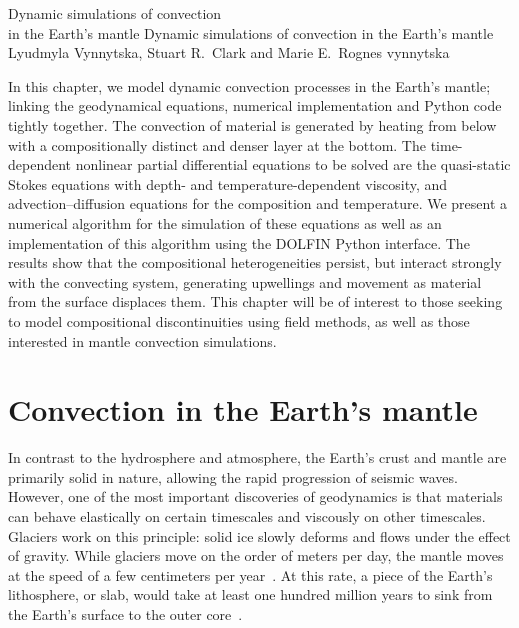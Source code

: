 \bgroup

\setcounter{chapter}{30}
\setcounter{chpnum}{30}

              {Dynamic simulations of convection\\ in the Earth's mantle}
              {Dynamic simulations of convection in the Earth's mantle}
              {Lyudmyla Vynnytska,  Stuart R.~Clark and Marie E.~Rognes}
              {vynnytska}


In this chapter, we model dynamic convection processes in the Earth's
mantle; linking the geodynamical equations, numerical implementation and
Python code tightly together. The convection of material is generated by
heating from below with a compositionally distinct and denser layer at
the bottom.  The time-dependent nonlinear partial differential equations
to be solved are the quasi-static Stokes equations with depth- and
temperature-dependent viscosity, and advection--diffusion equations for
the composition and temperature.  We present a numerical algorithm for
the simulation of these equations as well as an implementation of this
algorithm using the DOLFIN Python interface.  The results show that the
compositional heterogeneities persist, but interact strongly with the
convecting system, generating upwellings and movement as material from
the surface displaces them. This chapter will be of interest to those
seeking to model compositional discontinuities using field methods,
as well as those interested in mantle convection simulations.

\section{Convection in the Earth's mantle}

In contrast to the hydrosphere and atmosphere, the Earth's crust and
mantle are primarily solid in nature, allowing the rapid progression
of seismic waves.  However, one of the most important discoveries
of geodynamics is that materials can behave elastically on certain
timescales and viscously on other timescales. Glaciers work on this
principle: solid ice slowly deforms and flows under the effect of gravity.
While glaciers move on the order of meters per day, the mantle moves
at the speed of a few centimeters per year~\citep{vanderMeer2010}.
At this rate, a piece of the Earth's lithosphere, or slab, would take
at least one hundred million years to sink from the Earth's surface to
the outer core~\citep{Jarvis2007}.

